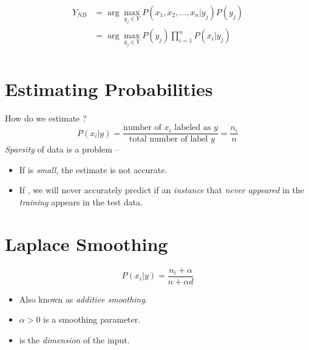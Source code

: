 \documentclass[
	number={3},
	title={Na\"iive Bayes Learning}
]{cs584notes}
\begin{document}
\begin{equation}
	\begin{aligned}
	Y_{NB} &= \arg\max_{y_{j} \in Y} P(x_{1}, x_{2}, \dots, x_{n} | y_{j})P(y_{j})\\
		   &= \arg\max_{y_{j} \in Y} P(y_{j})\prod_{i=1}^{n} P(x_{i} | y_{j})\\
	\end{aligned}
	\label{eq:naive-bayes-classifier}
\end{equation}

\section{Estimating Probabilities}\label{sec:estimating-probabilities}
How do we estimate ?
\begin{equation}
	P(x_{i} | y) = \frac{\mbox{number of } x_{i} \mbox{ labeled as } y}{\mbox{ total number of label } y} = \frac{n_{i}}{n}
	\label{eq:estimating-probabilities}
\end{equation}
\emph{Sparsity} of data is a problem --
\begin{itemize}
	\item If  is \emph{small}, the estimate is not accurate.
	\item If , we will never accurately predict  if an \emph{instance} that \emph{never appeared} in the \emph{training} appears in the test data.
\end{itemize}

\section{Laplace Smoothing}\label{sec:laplace-smoothing}
\begin{equation}
	P(x_{i} | y) = \frac{n_{i} + \alpha}{n + \alpha d}
	\label{eq:laplace-smoothing}
\end{equation}
\begin{itemize}
	\item Also known as \emph{additive smoothing}.
	\item $\alpha > 0$ is a smoothing parameter.
	\item {} is the \emph{dimension} of the input.
\end{itemize}
\end{document}
